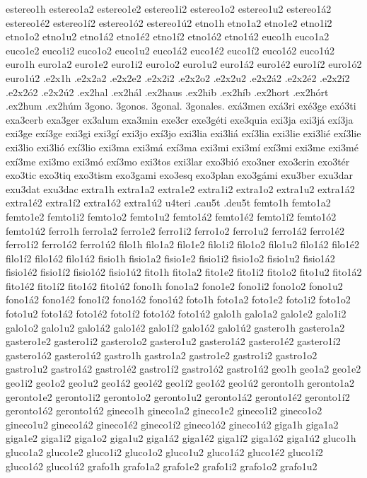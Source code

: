 {estereo1h
estereo1a2 estereo1e2 estereo1i2 estereo1o2 estereo1u2
estereo1á2 estereo1é2 estereo1í2 estereo1ó2 estereo1ú2
etno1h
etno1a2 etno1e2 etno1i2 etno1o2 etno1u2
etno1á2 etno1é2 etno1í2 etno1ó2 etno1ú2
euco1h
euco1a2 euco1e2 euco1i2 euco1o2 euco1u2
euco1á2 euco1é2 euco1í2 euco1ó2 euco1ú2
euro1h
euro1a2 euro1e2 euro1i2 euro1o2 euro1u2
euro1á2 euro1é2 euro1í2 euro1ó2 euro1ú2
.e2x1h
.e2x2a2 .e2x2e2 .e2x2i2 .e2x2o2 .e2x2u2
.e2x2á2 .e2x2é2 .e2x2í2 .e2x2ó2 .e2x2ú2
.ex2hal
.ex2hál
.ex2haus
.ex2hib
.ex2híb
.ex2hort
.ex2hórt
.ex2hum
.ex2húm
3gono.
3gonos.
3gonal.
3gonales.
exá3men
exá3ri
exé3ge
exó3ti
exa3cerb
exa3ger
ex3alum
exa3min
exe3cr
exe3géti
exe3quia
exi3ja
exi3já
exí3ja
exi3ge
exí3ge
exi3gi
exi3gí
exi3jo
exí3jo
exi3lia
exi3liá
exí3lia
exi3lie
exi3lié
exí3lie
exi3lio
exi3lió
exí3lio
exi3ma
exi3má
exí3ma
exi3mi
exi3mí
exí3mi
exi3me
exi3mé
exí3me
exi3mo
exi3mó
exí3mo
exi3tos
exi3lar
exo3bió
exo3ner
exo3crin
exo3tér
exo3tic
exo3tiq
exo3tism
exo3gami
exo3esq
exo3plan
exo3gámi
exu3ber
exu3dar
exu3dat
exu3dac
extra1h
extra1a2 extra1e2 extra1i2 extra1o2 extra1u2
extra1á2 extra1é2 extra1í2 extra1ó2 extra1ú2
u4teri
.cau5t
.deu5t
femto1h
femto1a2 femto1e2 femto1i2 femto1o2 femto1u2
femto1á2 femto1é2 femto1í2 femto1ó2 femto1ú2
ferro1h
ferro1a2 ferro1e2 ferro1i2 ferro1o2 ferro1u2
ferro1á2 ferro1é2 ferro1í2 ferro1ó2 ferro1ú2
filo1h
filo1a2 filo1e2 filo1i2 filo1o2 filo1u2
filo1á2 filo1é2 filo1í2 filo1ó2 filo1ú2
fisio1h
fisio1a2 fisio1e2 fisio1i2 fisio1o2 fisio1u2
fisio1á2 fisio1é2 fisio1í2 fisio1ó2 fisio1ú2
fito1h
fito1a2 fito1e2 fito1i2 fito1o2 fito1u2
fito1á2 fito1é2 fito1í2 fito1ó2 fito1ú2
fono1h
fono1a2 fono1e2 fono1i2 fono1o2 fono1u2
fono1á2 fono1é2 fono1í2 fono1ó2 fono1ú2
foto1h
foto1a2 foto1e2 foto1i2 foto1o2 foto1u2
foto1á2 foto1é2 foto1í2 foto1ó2 foto1ú2
galo1h
galo1a2 galo1e2 galo1i2 galo1o2 galo1u2
galo1á2 galo1é2 galo1í2 galo1ó2 galo1ú2
gastero1h
gastero1a2 gastero1e2 gastero1i2 gastero1o2 gastero1u2
gastero1á2 gastero1é2 gastero1í2 gastero1ó2 gastero1ú2
gastro1h
gastro1a2 gastro1e2 gastro1i2 gastro1o2 gastro1u2
gastro1á2 gastro1é2 gastro1í2 gastro1ó2 gastro1ú2
geo1h
geo1a2 geo1e2 geo1i2 geo1o2 geo1u2
geo1á2 geo1é2 geo1í2 geo1ó2 geo1ú2
geronto1h
geronto1a2 geronto1e2 geronto1i2 geronto1o2 geronto1u2
geronto1á2 geronto1é2 geronto1í2 geronto1ó2 geronto1ú2
gineco1h
gineco1a2 gineco1e2 gineco1i2 gineco1o2 gineco1u2
gineco1á2 gineco1é2 gineco1í2 gineco1ó2 gineco1ú2
giga1h
giga1a2 giga1e2 giga1i2 giga1o2 giga1u2
giga1á2 giga1é2 giga1í2 giga1ó2 giga1ú2
gluco1h
gluco1a2 gluco1e2 gluco1i2 gluco1o2 gluco1u2
gluco1á2 gluco1é2 gluco1í2 gluco1ó2 gluco1ú2
grafo1h
grafo1a2 grafo1e2 grafo1i2 grafo1o2 grafo1u2
}

